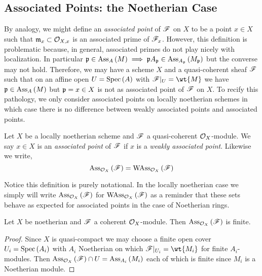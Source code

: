 \documentclass[12pt]{article}
\begin{document}
\subsection{Associated Points: the Noetherian Case}

\begin{rmk}
By analogy, we might define an \textit{associated point} of $\mathscr{F}$ on $X$ to be a point $x \in X$ such that $\mathfrak{m}_x \subset \mathcal{O}_{X, x}$ is an associated prime of $\mathscr{F}_x$. However, this definition is problematic because, in general, associated primes do not play nicely with localization. In particular $\mathfrak{p} \in \mathrm{Ass}_{A}\left( M \right) \implies \mathfrak{p} A_{\mathfrak{p}} \in \mathrm{Ass}_{A_{\mathfrak{p}}}\left( M_{\mathfrak{p}} \right)$ but the converse may not hold. Therefore, we may have a scheme $X$ and a quasi-coherent sheaf $\mathscr{F}$ such that on an affine open $U = \mathrm{Spec}\left( A \right)$ with $\F |_U = \wt{M}$ we have $\mathfrak{p} \in \mathrm{Ass}_{A}\left( M \right)$ but $\mathfrak{p} = x \in X$ is not as associated point of $\mathscr{F}$ on $X$. To recify this pathology, we only consider associated points on locally noetherian schemes in which case there is no difference between weakly associated points and associated points. 
\end{rmk}

\begin{defn}
Let $X$ be a locally noetherian scheme and $\mathscr{F}$ a quasi-coherent $\mathcal{O}_{X}$-module. We say $x \in X$ is an \textit{associated point} of $\mathscr{F}$ if $x$ is a \textit{weakly associated point}. Likewise we write, 
\[ \mathrm{Ass}_{\mathcal{O}_{X}}\left( \mathscr{F} \right) = \mathrm{WAss}_{\mathcal{O}_{X}}\left(\mathscr{F} \right) \]
\end{defn}

\begin{rmk}
Notice this definition is purely notational. In the locally noetherian case we simply will write $\mathrm{Ass}_{\mathcal{O}_{X}}\left( \mathscr{F} \right)$ for $\mathrm{WAss}_{\mathcal{O}_{X}}\left(\mathscr{F} \right)$ as a reminder that these sets behave as expected for associated points in the case of Noetherian rings.
\end{rmk}

\begin{prop}
Let $X$ be noetherian and $\mathscr{F}$ a coherent $\mathcal{O}_{X}$-module. Then $\mathrm{Ass}_{\mathcal{O}_{X}}\left( \mathscr{F} \right)$ is finite.
\end{prop}

\begin{proof}
Since $X$ is quasi-compact we may choose a finite open cover $U_i = \mathrm{Spec}\left( A_i \right)$ with $A_i$ Noetherian on which $\F|_{U_i} = \wt{M_i}$ for finite $A_i$-modules. Then $\mathrm{Ass}_{\mathcal{O}_{X}}\left( \mathscr{F} \right) \cap U = \mathrm{Ass}_{A_i}\left( M_i \right)$ each of which is finite  since $M_i$ is a Noetherian module.
\end{proof}
\end{document}
